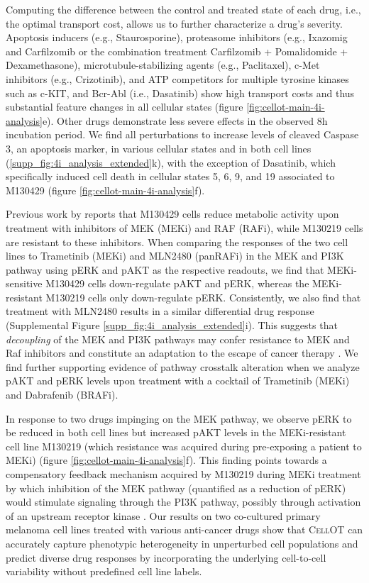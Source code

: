 Computing the difference between the control and treated state of each drug, i.e., the optimal
transport cost, allows us to further characterize a drug's severity. 
Apoptosis inducers (e.g., Staurosporine), proteasome inhibitors (e.g., Ixazomig and Carfilzomib or the combination treatment Carfilzomib + Pomalidomide + Dexamethasone), microtubule-stabilizing agents (e.g., Paclitaxel), c-Met inhibitors (e.g., Crizotinib), and ATP competitors for multiple tyrosine kinases such as c-KIT, and Bcr-Abl (i.e., Dasatinib) show high transport costs and thus substantial feature changes in all cellular states (figure \ref{fig:cellot-main-4i-analysis}e).
Other drugs demonstrate less severe effects in the observed 8h incubation period. 
We find all perturbations to increase levels of cleaved Caspase 3, an apoptosis marker, in various cellular states and in both cell lines (\ref{supp_fig:4i_analysis_extended}k),
with the exception of Dasatinib, which specifically induced cell death in cellular states 5, 6, 9, and 19 associated to M130429 (figure \ref{fig:cellot-main-4i-analysis}f).


Previous work by \citet{smith2016} reports that M130429 cells reduce metabolic activity %
upon treatment with inhibitors of MEK (MEKi) and RAF (RAFi), while M130219 cells are resistant to these inhibitors.
When comparing the responses of the two cell lines to Trametinib (MEKi) and MLN2480 (panRAFi) in the MEK and PI3K pathway using pERK and pAKT as the respective readouts, we find that MEKi-sensitive M130429 cells down-regulate pAKT and pERK, whereas the MEKi-resistant M130219 cells only down-regulate pERK.
Consistently, we also find that treatment with MLN2480 results in a similar differential drug response (Supplemental Figure \ref{supp_fig:4i_analysis_extended}i).
This suggests that \textit{decoupling} of the MEK and PI3K pathways may confer resistance to MEK and Raf inhibitors and constitute an adaptation to the escape of cancer therapy \cite{kun2021}.
We find further supporting evidence of pathway crosstalk alteration when we analyze pAKT and pERK levels upon treatment with a cocktail of Trametinib (MEKi) and Dabrafenib (BRAFi). 

In response to two drugs impinging on the MEK pathway, we observe pERK to be reduced in both cell lines but increased pAKT levels in the MEKi-resistant cell line M130219 (which resistance was acquired during pre-exposing a patient to MEKi) (figure \ref{fig:cellot-main-4i-analysis}f).
This finding points towards a compensatory feedback mechanism acquired by M130219 during MEKi treatment by which inhibition of the MEK pathway (quantified as a reduction of pERK) would stimulate signaling through the PI3K pathway, possibly through activation of an upstream receptor kinase \cite{caunt2015}. 
Our results on two co-cultured primary melanoma cell lines treated with various anti-cancer drugs show that \textsc{CellOT} can accurately capture phenotypic heterogeneity in unperturbed cell populations and predict diverse drug responses by incorporating the underlying cell-to-cell variability without predefined cell line labels. 

